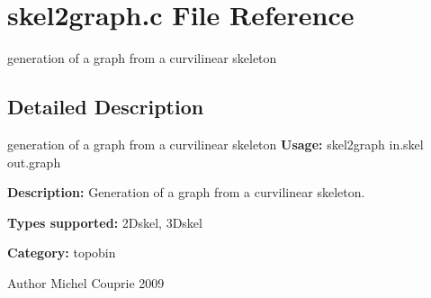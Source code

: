 \section{skel2graph.c File Reference}
\label{skel2graph_8c}


generation of a graph from a curvilinear skeleton  




\subsection{Detailed Description}
generation of a graph from a curvilinear skeleton {\bfseries Usage:} skel2graph in.skel out.graph

{\bfseries Description:} Generation of a graph from a curvilinear skeleton.

{\bfseries Types supported:} 2Dskel, 3Dskel

{\bfseries Category:} topobin

\begin{DoxyAuthor}{Author}
Michel Couprie 2009 
\end{DoxyAuthor}
